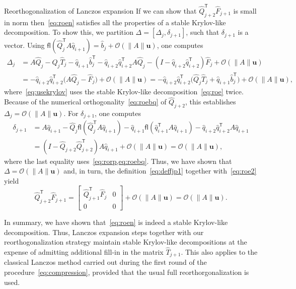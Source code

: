 \documentclass{siamart190516}
\newcommand{\Ttran}{\mathsf{T}}
\newcommand{\order}{\mathcal{O}}
\newcommand{\fl}{\mathsf{fl}}
\newcommand{\mpr}{\mathbf{u}}
\providecommand{\norm}[1]{\lVert#1\rVert}
\begin{document}
\begin{paragraph}{Reorthogonalization of Lanczos expansion}
If we can show that $\widehat{Q}_{j+2}^{\Ttran}\widehat{F}_{j+1}$ is small in norm then~\eqref{eq:roen} satisfies all the properties of a stable Krylov-like decomposition. To show this, we partition $\Delta=[\Delta_{j},\delta_{j+1}]$, such that $\delta_{j+1}$ is a vector.
Using $\fl(\widehat{Q}_{j}^{\Ttran}A\widehat{q}_{i+1}) = \widehat b_j+\order(\norm{A}\mpr)$, one computes
\begin{align}
 \Delta_{j} &= A\widehat{Q}_{j}-\widehat{Q}_{j}\widehat{T}_{j}-\widehat{q}_{i+1} \widehat b_j^\Ttran - \widehat{q}_{i+2}\widehat{q}_{i+2}^{\Ttran}A\widehat{Q}_{j}-(I-\widehat{q}_{i+2}\widehat{q}_{i+2}^{\Ttran})\widehat{F}_{j} + \order(\norm{A}\mpr) \nonumber \\
 &= - \widehat{q}_{i+2}\widehat{q}_{i+2}^{\Ttran}\big( A\widehat{Q}_{j}-\widehat{F}_{j} \big) + \order(\norm{A}\mpr) =
 - \widehat{q}_{i+2}\widehat{q}_{i+2}^{\Ttran}\big( \widehat{Q}_{j}\widehat{T}_{j}+\widehat{q}_{i+1}\widehat{b}_{j}^{\Ttran} \big) + \order(\norm{A}\mpr),  \label{eq:usekrylov} 
\end{align}
where~\eqref{eq:usekrylov} uses the stable Krylov-like decomposition~\cref{eq:roe} twice.
Because of the numerical orthogonality~\cref{eq:roebq} of $\widehat{Q}_{j+2}$, this establishes $\Delta_{j} = \order(\norm{A}\mpr)$.
For $\delta_{j+1}$, one computes
\begin{equation*}
    \begin{aligned}
        \delta_{j+1} &= A\widehat{q}_{i+1}-\widehat{Q}_{j}\fl(\widehat{Q}_{j}^{\Ttran}A\widehat{q}_{i+1})-\widehat{q}_{i+1}\fl(\widehat{q}_{i+1}^{\Ttran}A\widehat{q}_{i+1})-\widehat{q}_{i+2}\widehat{q}_{i+2}^{\Ttran}A\widehat{q}_{i+1}\\ 
        &= (I-\widehat{Q}_{j+2}\widehat{Q}_{j+2}^{\Ttran})A\widehat{q}_{i+1}+\order(\norm{A}\mpr) = \order(\norm{A}\mpr),
    \end{aligned}
\end{equation*}
where the last equality uses~\cref{eq:rorp,eq:roebq}.
Thus, we have shown that $\Delta=\order(\norm{A}\mpr)$ and, in turn, the definition~\cref{eq:deffjp1} together with~\cref{eq:roe2} yield
\begin{equation*}
    \widehat{Q}_{j+2}^{\Ttran}\widehat{F}_{j+1}
    =\begin{bmatrix}
        \widehat{Q}_{j+1}^{\Ttran}\widehat{F}_{j}&0\\ 
        0 &0
    \end{bmatrix}+\order(\norm{A}\mpr) = \order(\norm{A}\mpr).
\end{equation*} 

In summary, we have shown that~\cref{eq:roen} is indeed a stable Krylov-like decomposition. Thus, Lanczos expansion steps together with our reorthogonalization strategy maintain stable Krylov-like decompositions at the expense of admitting additional fill-in in the matrix $\widehat{T}_{j+1}$. This also applies to the classical Lanczos method carried out during the first round of the procedure~\eqref{eq:compression}, provided that the usual full reorthorgonalization is used.
\end{paragraph}
\end{document}
